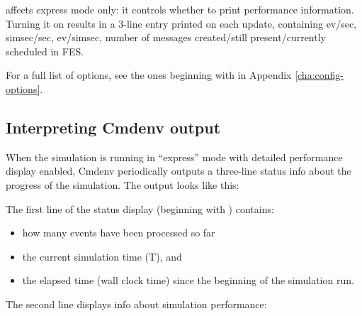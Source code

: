  affects express mode only: it controls
whether to print performance information. Turning it on results in a 3-line
entry printed on each update, containing ev/sec, simsec/sec, ev/simsec,
number of messages created/still present/currently scheduled in FES.

For a full list of options, see the ones beginning with  in
Appendix \ref{cha:config-options}.


\subsection{Interpreting Cmdenv output}
\label{sec:ch-run-sim:interpreting-cmdenv-output}

When the simulation is running in ``express'' mode with detailed
performance display enabled, Cmdenv periodically outputs a three-line
status info about the progress of the simulation.
The output looks like this:


The first line of the status display (beginning with \ttt{**})
contains:

\begin{itemize}
   \item{how many events have been processed so far}
   \item{the current simulation time (T), and}
   \item{the elapsed time (wall clock time) since the beginning of the simulation run.}
\end{itemize}

The second line displays info about simulation performance:

